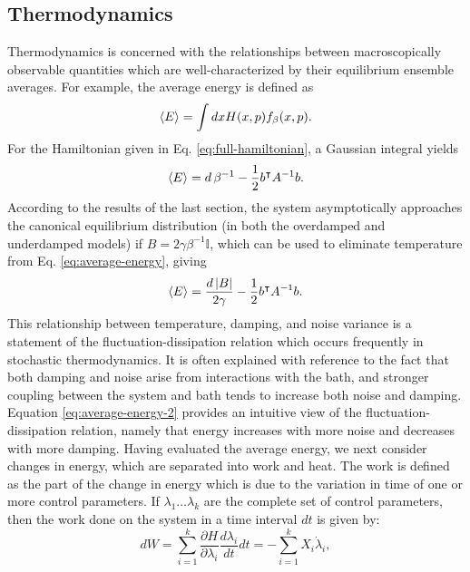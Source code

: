 \documentclass[prx,onecolumn,floatfix,longbibliography,notitlepage, nofootinbib]{revtex4-1}
\begin{document}
\begin{appendix}
\subsection{Thermodynamics}
Thermodynamics is concerned with the relationships between macroscopically observable quantities which are well-characterized by their equilibrium ensemble averages. For example, the average energy is defined as
\begin{equation}
    \braket{E} = \int dx H(x,p) f_\beta(x,p).\\
\end{equation}
For the Hamiltonian given in Eq. \eqref{eq:full-hamiltonian}, a Gaussian integral yields
\begin{equation}
\label{eq:average-energy}
    \braket{E} =  d \, \beta^{-1}-\frac{1}{2}b^\intercal A^{-1} b.
\end{equation}
According to the results of the last section, the system asymptotically approaches the canonical equilibrium distribution (in both the overdamped and underdamped models) if $B = 2\gamma \beta^{-1}\mathbb{I}$, which can be used to eliminate temperature from Eq. \eqref{eq:average-energy}, giving
\begin{equation}
\label{eq:average-energy-2}
    \braket{E} = \frac{d\left|B\right|}{2 \gamma} -\frac{1}{2}b^\intercal A^{-1} b.
\end{equation}
This relationship between temperature, damping, and noise variance is a statement of the fluctuation-dissipation relation which occurs frequently in stochastic thermodynamics. It is often explained with reference to the fact that both damping and noise arise from interactions with the bath, and stronger coupling between the system and bath tends to increase both noise and damping. Equation \eqref{eq:average-energy-2} provides an intuitive view of the fluctuation-dissipation relation, namely that energy increases with more noise and decreases with more damping. Having evaluated the average energy, we next consider changes in energy, which are separated into work and heat. The work is defined as the part of the change in energy which is due to the variation in time of one or more control parameters. If $\lambda_1 \dots \lambda_k$ are the complete set of control parameters, then the work done on the system in a time interval $dt$ is \cite{seifert2008stochastic} given by:
\begin{equation}
    dW = \sum_{i=1}^k \frac{\partial H}{\partial \lambda_i} \frac{d \lambda_i}{d t} dt = -\sum_{i=1}^k X_i \dot{\lambda}_i,
\end{equation}

\end{appendix}
\end{document}
